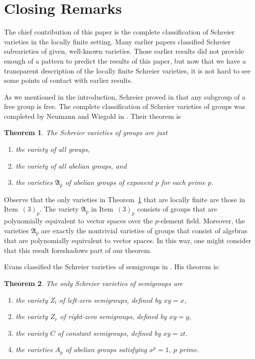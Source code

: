 \documentclass[12pt]{amsart}
\newtheorem{thm}{Theorem}[section] %
\theoremstyle{definition}
\numberwithin{equation}{section}
\begin{document}
\section{Closing Remarks} \label{closing}

The chief contribution of this paper
is the complete classification of Schreier
varieties in the locally finite setting.
Many earlier papers classified Schreier
subvarieties of given, well-known varieties.
Those earlier results did not provide enough
of a pattern to predict the results of this paper,
but now that we have a transparent
description of the locally finite Schreier varieties,
it is not hard to see some points of contact
with earlier results.

As we mentioned in the introduction,
Schreier proved in \cite{schreier}
that any subgroup of a free group is free.
The complete classification of Schreier varieties
of groups was completed by 
Neumann and Wiegold in \cite{neumann-wiegold}.
Their theorem is

\begin{thm} \label{NMx}
The Schreier varieties of groups are just 
\begin{enumerate}
\item[$(1)\hphantom{_p}$] the variety of all groups,
\item[$(2)\hphantom{_p}$] the variety of all abelian groups, and
\item[$(3)_p$] the varieties $\mathfrak{A}_p$ of abelian groups
  of exponent $p$ for each prime $p$.
\end{enumerate}
\end{thm}

Observe that the only varieties in Theorem~\ref{NMx}
that are locally finite are those in Item~$(3)_p$.
The variety $\mathfrak{A}_p$
in Item~$(3)_p$ consists of groups that are polynomially
equivalent to vector spaces over the $p$-element field.
Moreover, the varieties $\mathfrak{A}_p$
are exactly the nontrivial varieties
of groups that consist of algebras that are polynomially
equivalent to vector spaces.
In this way, one might consider
that this result foreshadows part of our theorem.
\bigskip

Evans classified the Schreier varieties of semigroups in
\cite{evans}. His theorem is:

\begin{thm} \label{TE}
The only Schreier varieties of semigroups are
\begin{enumerate}
\item the variety $Z_l$ of left-zero semigroups, defined by $xy = x$,
\item the variety $Z_r$ of right-zero semigroups, defined by $xy = y$,
\item the variety $C$ of constant semigroups, defined by $xy = zt$.
\item the varieties $A_p$ of abelian groups
  satisfying $x^p = 1$, $p$ prime.
\end{enumerate}  
\end{thm}
\end{document}
